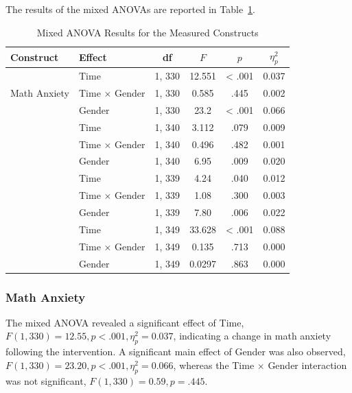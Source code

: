 The results of the mixed ANOVAs are reported in Table~\ref{tab:anova_results}.

\begin{table}[H]
\centering

\caption{Mixed ANOVA Results for the Measured Constructs}
\label{tab:anova_results}
\vspace{0.3cm}
\renewcommand{\arraystretch}{1.2}

\begin{tabularx}{\textwidth}{l l c c c c}
\toprule
Construct & Effect & df & $F$ & $p$ & \boldmath$\eta^2_p$ \\
\midrule

\multirow{3}{*}{Math Anxiety}
& Time & 1, 330 & 12.551 & < .001 & 0.037 \\
& Time $\times$ Gender & 1, 330 & 0.585 & .445 & 0.002 \\
& Gender & 1, 330 & 23.2 & < .001 & 0.066 \\

\addlinespace

\multirow{3}{*}{Math Self-Efficacy}
& Time & 1, 340 & 3.112 & .079 & 0.009 \\
& Time $\times$ Gender & 1, 340 & 0.496 & .482 & 0.001 \\
& Gender & 1, 340 & 6.95 & .009 & 0.020 \\

\addlinespace

\multirow{3}{*}{Math Attitudes}
& Time & 1, 339 & 4.24 & .040 & 0.012 \\
& Time $\times$ Gender & 1, 339 & 1.08 & .300 & 0.003 \\
& Gender & 1, 339 & 7.80 & .006 & 0.022 \\

\addlinespace

\multirow{3}{*}{Gender Stereotypes}
& Time & 1, 349 & 33.628 & < .001 & 0.088 \\
& Time $\times$ Gender & 1, 349 & 0.135 & .713 & 0.000 \\
& Gender & 1, 349 & 0.0297 & .863 & 0.000 \\

\bottomrule
\end{tabularx}

\end{table}

\subsubsection*{Math Anxiety}
The mixed ANOVA revealed a significant effect of Time, $F(1, 330) = 12.55, p < .001, \eta^2_p = 0.037$, indicating a change in math anxiety following the intervention. A significant main effect of Gender was also observed, $F(1, 330) = 23.20, p < .001, \eta^2_p = 0.066$, whereas the Time $\times$ Gender interaction was not significant, $F(1, 330) = 0.59, p = .445$.

